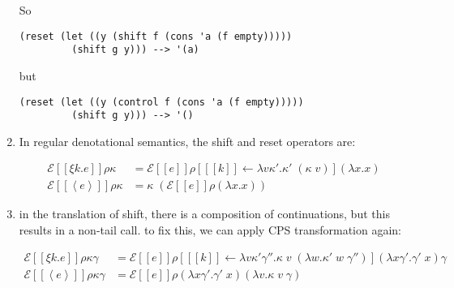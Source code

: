 \documentclass[letterpaper]{llncs}
\newcommand{\app}[2]{ \ensuremath{ #1 \; #2 } }
\newcommand{\apptwo}[3]{ \ensuremath{ #1 \; #2 \; #3 } }
\newcommand{\appp}[2]{ \ensuremath{ (\app{#1}{#2}) } }
\newcommand{\lam}[2]{ \ensuremath{ \lambda #1.#2 } }
\newcommand{\lamp}[2]{ \ensuremath{ (\lam{#1}{#2}) } }
\newcommand{\shift}[2]{ \ensuremath{ \xi #1.#2 } }
\newcommand{\reset}[1]{ \ensuremath{ \left\langle #1 \right\rangle } }
\newcommand{\idcont}{ \ensuremath{ \lamp{x}{x} } }
\newcommand{\idconttwo}{ \ensuremath{ \lamp{x\gamma'}{\app{\gamma'}{x}} } }
\newcommand{\deno}[1]{ \ensuremath{ [\![ #1 ]\!] } }
\newcommand{\eval}[3]{ \ensuremath{ \mathcal{E}\deno{#1} #2 #3 } }
\newcommand{\evaldefault}[1]{ \ensuremath{ \eval{#1}{\rho}{\kappa} } }
\newcommand{\evaltwo}[4]{ \ensuremath{ \mathcal{E}\deno{#1} #2 #3 #4 } }
\newcommand{\evaltwodefault}[1]{ \ensuremath{ \eval{#1}{\rho}{\kappa}{\gamma} } }
\begin{document}
\begin{enumerate}
So
\begin{verbatim}
(reset (let ((y (shift f (cons 'a (f empty)))))
         (shift g y))) --> '(a)
\end{verbatim}
 but
\begin{verbatim}
(reset (let ((y (control f (cons 'a (f empty)))))
         (shift g y))) --> '()
\end{verbatim}

\item In regular denotational semantics, the shift and reset operators are:

\begin{align*}
\evaldefault{\shift{k}{e}} &= 
\eval{e}{\rho[\deno{k} \leftarrow 
              \lam{v\kappa'}
                  {\app{\kappa'}
                       {\appp{\kappa}{v}}}]}
        {\idcont} \\
\evaldefault{\reset{e}} &=
\app{ \kappa }
    { (\eval{e}{\rho}{\idcont}) }
\end{align*}

	\item in the translation of shift, there is a composition of continuations, but this results in a non-tail call. to fix this, we can apply CPS transformation again:
	
\begin{align*}
\evaltwodefault{\shift{k}{e}} &= 
\evaltwo{e}
        {\rho[\deno{k} \leftarrow 
              \lam{v\kappa'\gamma''}
                  {\apptwo{\kappa}
                          {v}
                          {\lamp{w}{\apptwo{\kappa'}{w}{\gamma''}}}}]}
        {\idconttwo}{\gamma} \\
\evaltwodefault{\reset{e}} &=
\evaltwo{e}{\rho}{\idconttwo}{\lamp{v}{\apptwo{\kappa}{v}{\gamma}}}
\end{align*}

 
\end{enumerate}







\end{document}
